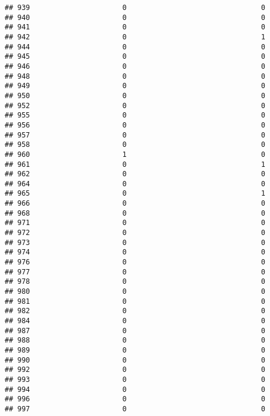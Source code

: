 \documentclass[
]{article}
\begin{document}
\begin{verbatim}
## 939                      0                                0
## 940                      0                                0
## 941                      0                                0
## 942                      0                                1
## 944                      0                                0
## 945                      0                                0
## 946                      0                                0
## 948                      0                                0
## 949                      0                                0
## 950                      0                                0
## 952                      0                                0
## 955                      0                                0
## 956                      0                                0
## 957                      0                                0
## 958                      0                                0
## 960                      1                                0
## 961                      0                                1
## 962                      0                                0
## 964                      0                                0
## 965                      0                                1
## 966                      0                                0
## 968                      0                                0
## 971                      0                                0
## 972                      0                                0
## 973                      0                                0
## 974                      0                                0
## 976                      0                                0
## 977                      0                                0
## 978                      0                                0
## 980                      0                                0
## 981                      0                                0
## 982                      0                                0
## 984                      0                                0
## 987                      0                                0
## 988                      0                                0
## 989                      0                                0
## 990                      0                                0
## 992                      0                                0
## 993                      0                                0
## 994                      0                                0
## 996                      0                                0
## 997                      0                                0

\end{verbatim}
\end{document}
